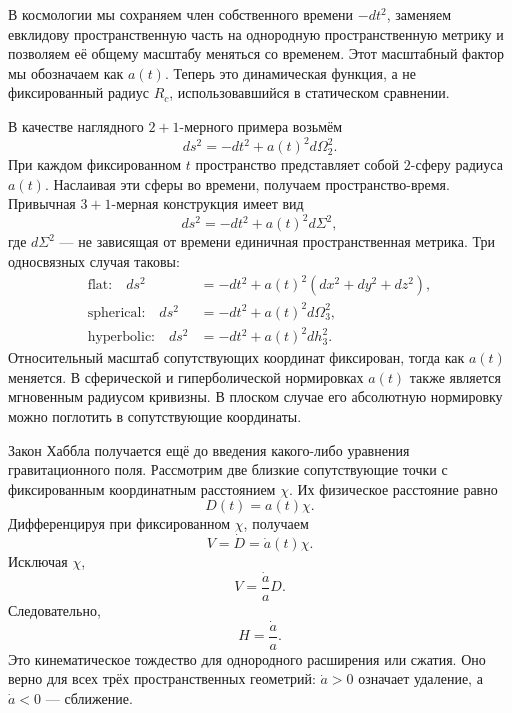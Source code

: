 В космологии мы сохраняем член собственного времени \(-dt^2\), заменяем евклидову пространственную часть на однородную пространственную метрику и позволяем её общему масштабу меняться со временем. Этот масштабный фактор мы обозначаем как \(a(t)\). Теперь это динамическая функция, а не фиксированный радиус \(R_c\), использовавшийся в статическом сравнении.

В качестве наглядного \(2+1\)-мерного примера возьмём
\begin{equation}
ds^2 = -dt^2 + a(t)^2 d\Omega_2^2.
\label{eq:c03-two-plus-one}
\end{equation}
При каждом фиксированном \(t\) пространство представляет собой \(2\)-сферу радиуса \(a(t)\). Наслаивая эти сферы во времени, получаем пространство-время. Привычная \(3+1\)-мерная конструкция имеет вид
\begin{equation}
ds^2 = -dt^2 + a(t)^2 d\Sigma^2,
\label{eq:c03-frw-general}
\end{equation}
где \(d\Sigma^2\) — не зависящая от времени единичная пространственная метрика. Три односвязных случая таковы:
\begin{align}
\text{flat:}\quad
ds^2&=-dt^2+a(t)^2\left(dx^2+dy^2+dz^2\right),\label{eq:c03-frw-flat}\\
\text{spherical:}\quad
ds^2&=-dt^2+a(t)^2d\Omega_3^2,\label{eq:c03-frw-spherical}\\
\text{hyperbolic:}\quad
ds^2&=-dt^2+a(t)^2dh_3^2.\label{eq:c03-frw-hyperbolic}
\end{align}
Относительный масштаб сопутствующих координат фиксирован, тогда как \(a(t)\) меняется. В сферической и гиперболической нормировках \(a(t)\) также является мгновенным радиусом кривизны. В плоском случае его абсолютную нормировку можно поглотить в сопутствующие координаты.

Закон Хаббла получается ещё до введения какого-либо уравнения гравитационного поля. Рассмотрим две близкие сопутствующие точки с фиксированным координатным расстоянием \(\chi\). Их физическое расстояние равно
\begin{equation}
D(t)=a(t)\chi.
\label{eq:c03-comoving-distance}
\end{equation}
Дифференцируя при фиксированном \(\chi\), получаем
\begin{equation}
V=\dot D=\dot a(t)\chi.
\end{equation}
Исключая \(\chi\),
\begin{equation}
V = \frac{\dot a}{a} D.
\label{eq:c03-hubble-law}
\end{equation}
Следовательно,
\begin{equation}
H = \frac{\dot a}{a}.
\label{eq:c03-hubble-parameter}
\end{equation}
Это кинематическое тождество для однородного расширения или сжатия. Оно верно для всех трёх пространственных геометрий: \(\dot a>0\) означает удаление, а \(\dot a<0\) — сближение.

